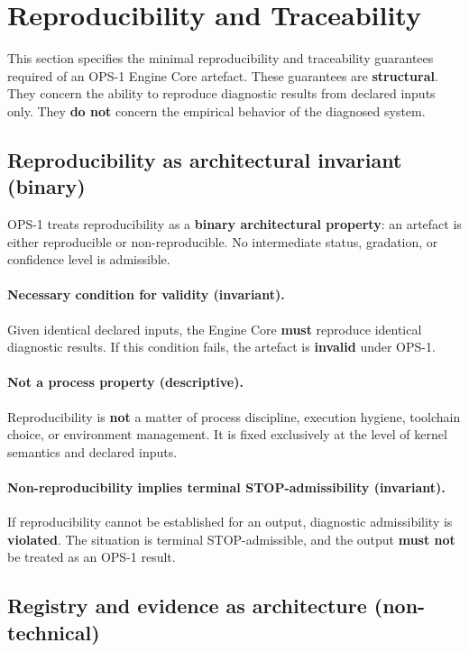 ﻿\section{Reproducibility and Traceability}

This section specifies the minimal reproducibility and traceability guarantees
required of an OPS-1 Engine Core artefact.
These guarantees are \textbf{structural}.
They concern the ability to reproduce diagnostic results from declared inputs
only.
They \textbf{do not} concern the empirical behavior of the diagnosed system.

\subsection{Reproducibility as architectural invariant (binary)}

OPS-1 treats reproducibility as a \textbf{binary architectural property}:
an artefact is either reproducible or non-reproducible.
No intermediate status, gradation, or confidence level is admissible.

\paragraph{Necessary condition for validity (invariant).}
Given identical declared inputs, the Engine Core \textbf{must} reproduce
identical diagnostic results.
If this condition fails, the artefact is \textbf{invalid} under OPS-1.

\paragraph{Not a process property (descriptive).}
Reproducibility is \textbf{not} a matter of process discipline,
execution hygiene, toolchain choice, or environment management.
It is fixed exclusively at the level of kernel semantics
and declared inputs.

\paragraph{Non-reproducibility implies terminal STOP-admissibility (invariant).}
If reproducibility cannot be established for an output,
diagnostic admissibility is \textbf{violated}.
The situation is terminal STOP-admissible,
and the output \textbf{must not} be treated as an OPS-1 result.

\subsection{Registry and evidence as architecture (non-technical)}

